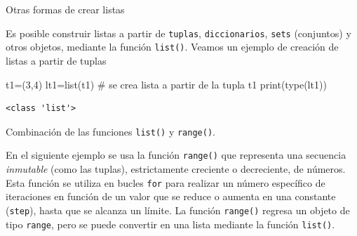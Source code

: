 \documentclass[
  ignorenonframetext,
  aspectratio=169,
  spanish,
]{beamer}
\newenvironment{Shaded}{\begin{snugshade}}{\end{snugshade}}
\newcommand{\BuiltInTok}[1]{\textcolor[rgb]{0.00,0.23,0.31}{#1}}
\newcommand{\CommentTok}[1]{\textcolor[rgb]{0.37,0.37,0.37}{#1}}
\newcommand{\DecValTok}[1]{\textcolor[rgb]{0.68,0.00,0.00}{#1}}
\newcommand{\NormalTok}[1]{\textcolor[rgb]{0.00,0.23,0.31}{#1}}
\newcommand{\OperatorTok}[1]{\textcolor[rgb]{0.37,0.37,0.37}{#1}}
\begin{document}
\begin{frame}[fragile]{Otras formas de crear listas}
\label{sec-ListasOtrasFormas}

Es posible construir listas a partir de \texttt{tuplas},
\texttt{diccionarios}, \texttt{sets} (conjuntos) y otros objetos,
mediante la función \texttt{list()}. Veamos un ejemplo de creación de
listas a partir de tuplas

\begin{Shaded}
\begin{Highlighting}[]
\NormalTok{t1}\OperatorTok{=}\NormalTok{(}\DecValTok{3}\NormalTok{,}\DecValTok{4}\NormalTok{) }
\NormalTok{lt1}\OperatorTok{=}\BuiltInTok{list}\NormalTok{(t1) }\CommentTok{\# se crea lista a partir de la tupla t1 }
\BuiltInTok{print}\NormalTok{(}\BuiltInTok{type}\NormalTok{(lt1)) }
\end{Highlighting}
\end{Shaded}

\begin{verbatim}
<class 'list'>
\end{verbatim}
\end{frame}

\begin{frame}[fragile]{Combinación de las funciones \texttt{list()} y
\texttt{range()}.}
\label{combinaciuxf3n-de-las-funciones-list-y-range.}


En el siguiente ejemplo se usa la función \texttt{range()} que
representa una secuencia \emph{inmutable} (como las tuplas),
estrictamente creciente o decreciente, de números. Esta función se
utiliza en bucles \texttt{for} para realizar un número específico de
iteraciones en función de un valor que se reduce o aumenta en una
constante (\texttt{step}), hasta que se alcanza un límite. La función
\texttt{range()} regresa un objeto de tipo \texttt{range}, pero se puede
convertir en una lista mediante la función \texttt{list()}.
\end{frame}
\end{document}
